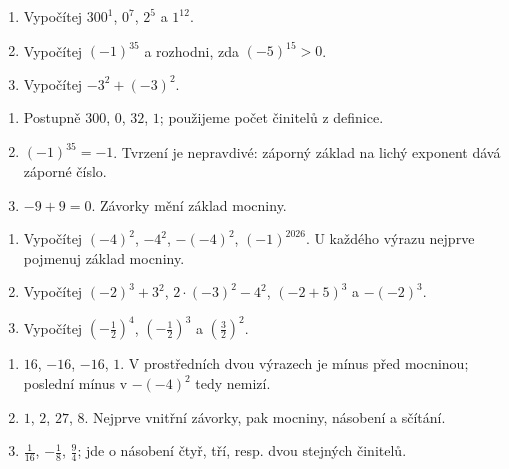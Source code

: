 \documentclass[11pt,a4paper]{article}
\begin{document}
\begin{zadaniReseniBox}[title={Procvičení},breakable=false]
\begin{enumerate}[label=\alph*)]
\item Vypočítej $300^1$, $0^7$, $2^5$ a $1^{12}$.
\item Vypočítej $(-1)^{35}$ a rozhodni, zda $(-5)^{15}>0$.
\item Vypočítej $-3^2+(-3)^2$.
\end{enumerate}
\tcblower
\begin{enumerate}[label=\alph*)]
\item Postupně $300$, $0$, $32$, $1$; použijeme počet činitelů z definice.
\item $(-1)^{35}=-1$. Tvrzení je nepravdivé: záporný základ na lichý exponent dává záporné číslo.
\item $-9+9=0$. Závorky mění základ mocniny.
\end{enumerate}
\end{zadaniReseniBox}





\begin{zadaniReseniBox}[title={Základ: závorky a pořadí operací},breakable=false]
\begin{enumerate}[label=\alph*)]
\item Vypočítej $(-4)^2$, $-4^2$, $-(-4)^2$, $(-1)^{2026}$. U každého výrazu nejprve pojmenuj základ mocniny.
\item Vypočítej $(-2)^3+3^2$, $2\cdot(-3)^2-4^2$, $(-2+5)^3$ a $-(-2)^3$.
\item Vypočítej $(-\tfrac12)^4$, $(-\tfrac12)^3$ a $(\tfrac32)^2$.
\end{enumerate}
\tcblower
\begin{enumerate}[label=\alph*)]
\item $16$, $-16$, $-16$, $1$. V prostředních dvou výrazech je mínus před mocninou; poslední mínus v $-(-4)^2$ tedy nemizí.
\item $1$, $2$, $27$, $8$. Nejprve vnitřní závorky, pak mocniny, násobení a sčítání.
\item $\frac1{16}$, $-\frac18$, $\frac94$; jde o násobení čtyř, tří, resp. dvou stejných činitelů.
\end{enumerate}
\end{zadaniReseniBox}
\end{document}

